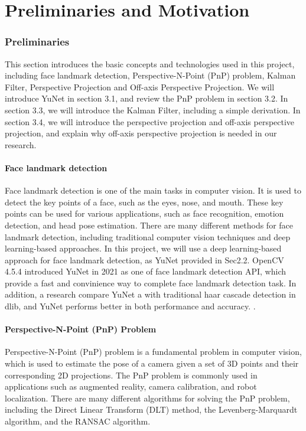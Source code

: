 \part{Preliminaries and Motivation}

\section {Preliminaries}
This section introduces the basic concepts and technologies used in this project, including face landmark detection, Perspective-N-Point (PnP) problem, Kalman Filter, Perspective Projection and Off-axis Perspective Projection. We will introduce YuNet in section 3.1, and review the PnP problem in section 3.2. In section 3.3, we will introduce the Kalman Filter, including a simple derivation. In section 3.4, we will introduce the perspective projection and off-axis perspective projection, and explain why off-axis perspective projection is needed in our research.
\subsection{Face landmark detection}
Face landmark detection is one of the main tasks in computer vision. It is used to detect the key points of a face, such as the eyes, nose, and mouth. These key points can be used for various applications, such as face recognition, emotion detection, and head pose estimation. There are many different methods for face landmark detection, including traditional computer vision techniques and deep learning-based approaches. In this project, we will use a deep learning-based approach for face landmark detection, as YuNet provided in Sec2.2. OpenCV 4.5.4\cite{opencv_4_5_4} introduced YuNet in 2021 as one of face landmark detection API, which provide a fast and convinience way to complete face landmark detection task. In addition, a research compare YuNet a with traditional haar cascade detection in dlib, and YuNet performs better in both performance and accuracy. \cite{chen2022opencv}.

\subsection{Perspective-N-Point (PnP) Problem}
Perspective-N-Point (PnP) problem is a fundamental problem in computer vision, which is used to estimate the pose of a camera given a set of 3D points and their corresponding 2D projections. The PnP problem is commonly used in applications such as augmented reality, camera calibration, and robot localization. There are many different algorithms for solving the PnP problem, including the Direct Linear Transform (DLT) method, the Levenberg-Marquardt algorithm, and the RANSAC algorithm. 

